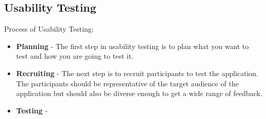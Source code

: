 \documentclass[12pt]{article}
\begin{document}
\subsection{Usability Testing}
Process of Usability Testing:
\begin{itemize}
    \item \textbf{Planning} - The first step in usability testing is to plan what you want to test and how you are going to test it.
    \item \textbf{Recruiting} - The next step is to recruit participants to test the application. The participants should be representative of the target audience of the application but should also be diverse enough to get a wide range of feedback.
    \item \textbf{Testing} - 
\end{itemize}
\end{document}
